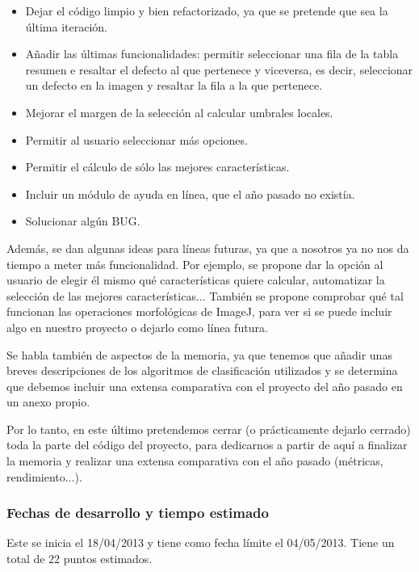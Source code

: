 \begin{itemize}
\item Dejar el código limpio y bien refactorizado, ya que se pretende que sea la última iteración.
\item Añadir las últimas funcionalidades: permitir seleccionar una fila de la tabla resumen e resaltar el defecto al que pertenece y viceversa, es decir, seleccionar un defecto en la imagen y resaltar la fila a la que pertenece.
\item Mejorar el margen de la selección al calcular umbrales locales.
\item Permitir al usuario seleccionar más opciones.
\item Permitir el cálculo de sólo las mejores características.
\item Incluir un módulo de ayuda en línea, que el año pasado no existía.
\item Solucionar algún BUG.
\end{itemize}

Además, se dan algunas ideas para líneas futuras, ya que a nosotros ya no nos da tiempo a meter más funcionalidad. Por ejemplo, se propone dar la opción al usuario de elegir él mismo qué características quiere calcular, automatizar la selección de las mejores características... También se propone comprobar qué tal funcionan las operaciones morfológicas de ImageJ, para ver si se puede incluir algo en nuestro proyecto o dejarlo como línea futura.

Se habla también de aspectos de la memoria, ya que tenemos que añadir unas breves descripciones de los algoritmos de clasificación utilizados y se determina que debemos incluir una extensa comparativa con el proyecto del año pasado en un anexo propio.

Por lo tanto, en este último \sprint{} pretendemos cerrar (o prácticamente dejarlo cerrado) toda la parte del código del proyecto, para dedicarnos a partir de aquí a finalizar la memoria y realizar una extensa comparativa con el año pasado (métricas, rendimiento...).


\subsubsection*{Fechas de desarrollo y tiempo estimado}
Este \sprint{} se inicia el 18/04/2013 y tiene como fecha límite el 04/05/2013. Tiene un total de 22 puntos estimados.


